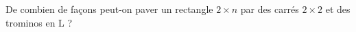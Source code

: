 De combien de façons peut-on paver un rectangle $2 \times n$ par des carrés $2 \times 2$ et des trominos en L ?
